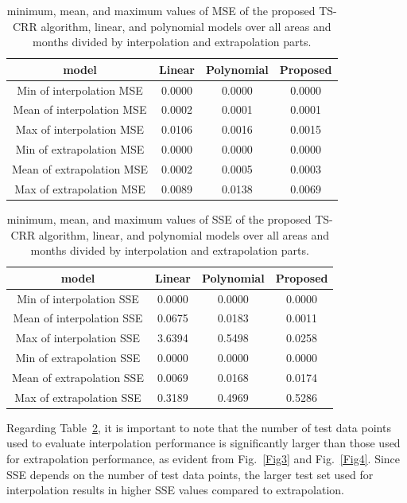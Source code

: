 \documentclass[smallextended,referee,envcountsect,,numbers]{svjour3}
\begin{document}
\begin{table}[htbp] 
	\centering
	\caption{minimum, mean, and maximum values of MSE of the proposed TS-CRR algorithm, linear, and polynomial models over all areas and months divided by interpolation and extrapolation parts. 
	\label{tbl2}}
		\begin{tabular}{|c|c|c|c|}\hline
			model&Linear&Polynomial&\textbf{Proposed}\\\hline
			Min of interpolation MSE&0.0000&0.0000&0.0000 \\\hline
			Mean of interpolation MSE&0.0002&0.0001&0.0001 \\\hline
			Max of interpolation MSE&0.0106&0.0016&0.0015 \\\hline
   	  Min of extrapolation MSE&0.0000&0.0000&0.0000 \\\hline
			Mean of extrapolation MSE&0.0002&0.0005&0.0003 \\\hline
			Max of extrapolation MSE&0.0089&0.0138&0.0069 \\\hline
		\end{tabular}	
\end{table}
\begin{table}[htbp] \label{tbl3}
	\centering
	\caption{minimum, mean, and maximum values of SSE of the proposed TS-CRR algorithm, linear, and polynomial models over all areas and months divided by interpolation and extrapolation parts. 
	\label{tbl3}}
		\begin{tabular}{|c|c|c|c|}\hline
			model&Linear&Polynomial&\textbf{Proposed}\\\hline
			Min of interpolation SSE&0.0000&0.0000&0.0000 \\\hline
			Mean of interpolation SSE&0.0675&0.0183&0.0011 \\\hline
			Max of interpolation SSE&3.6394&0.5498&0.0258 \\\hline
   	  Min of extrapolation SSE&0.0000&0.0000&0.0000 \\\hline
			Mean of extrapolation SSE&0.0069&0.0168&0.0174 \\\hline
			Max of extrapolation SSE&0.3189&0.4969&0.5286 \\\hline
		\end{tabular}	
\end{table}

Regarding Table~\ref{tbl3}, it is important to note that the number of test data points used to evaluate interpolation performance is significantly larger than those used for extrapolation performance, as evident from Fig.~\ref{Fig3} and Fig.~\ref{Fig4}. Since SSE depends on the number of test data points, the larger test set used for interpolation results in higher SSE values compared to extrapolation.
\end{document}
